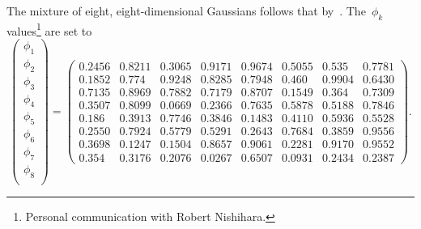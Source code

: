 The mixture of eight, eight-dimensional Gaussians follows that by~\citet{nishihara-2014-gess}.
The~$\phi_k$ values\footnote{Personal communication with Robert Nishihara.} are set to
\[
\begin{pmatrix}
\phi_1 \\
\phi_2 \\
\phi_3 \\
\phi_4 \\
\phi_5 \\
\phi_6 \\
\phi_7 \\
\phi_8 \\
\end{pmatrix}
= \begin{pmatrix}
0.2456 &  0.8211 &  0.3065 &  0.9171 &
0.9674 &  0.5055 &  0.535  &  0.7781 \\
0.1852 &  0.774  &  0.9248 &  0.8285 &
0.7948 &  0.460  &  0.9904 &  0.6430 \\
0.7135 &  0.8969 &  0.7882 &  0.7179 &
0.8707 &  0.1549 &  0.364  &  0.7309 \\
0.3507 &  0.8099 &  0.0669 &  0.2366 &
0.7635 &  0.5878 &  0.5188 &  0.7846 \\
0.186  &  0.3913 &  0.7746 &  0.3846 &
0.1483 &  0.4110 &  0.5936 &  0.5528 \\
0.2550 &  0.7924 &  0.5779 &  0.5291 &
0.2643 &  0.7684 &  0.3859 &  0.9556 \\
0.3698 &  0.1247 &  0.1504 &  0.8657 &
0.9061 &  0.2281 &  0.9170 &  0.9552 \\
0.354  &  0.3176 &  0.2076 &  0.0267 &
0.6507 &  0.0931 &  0.2434 &  0.2387
\end{pmatrix}.
\]